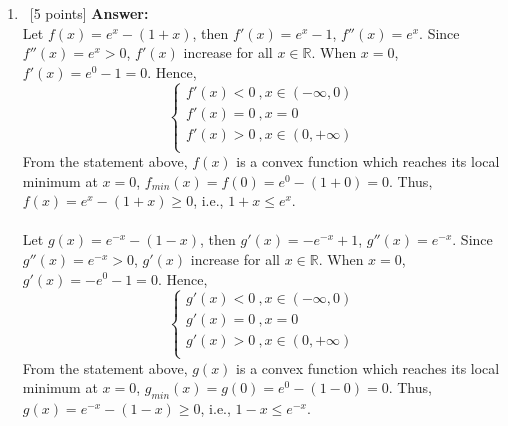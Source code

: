 \documentclass[12pt, fullpage,letterpaper]{article}
\begin{document}
\begin{enumerate}
\item~[5 points]
\textbf{Answer:}\\
Let $f(x)=e^x-(1+x)$, then $f'(x)=e^x-1$, $f''(x)=e^x$. Since $f''(x)=e^x > 0$, $f'(x)$ increase for all $x \in \mathbb{R}$. When $x=0$, $f'(x)=e^0-1=0$. Hence,
\[
\begin{cases}
f'(x)<0 \ ,x \in (-\infty, 0)\\
f'(x)=0 \ ,x = 0\\
f'(x)>0 \ ,x \in (0, +\infty)\\
\end{cases}
\]
From the statement above, $f(x)$ is a convex function which reaches its local minimum at $x=0$, $f_{min}(x)=f(0)=e^0-(1+0)=0$. Thus, $f(x)=e^x-(1+x) \ge 0$, i.e., $1+x \le e^x$.\\\\
Let $g(x)=e^{-x}-(1-x)$, then $g'(x)=-e^{-x}+1$, $g''(x)=e^{-x}$. Since $g''(x)=e^{-x} > 0$, $g'(x)$ increase for all $x \in \mathbb{R}$. When $x=0$, $g'(x)=-e^0-1=0$. Hence,
\[
\begin{cases}
g'(x)<0 \ ,x \in (-\infty, 0)\\
g'(x)=0 \ ,x = 0\\
g'(x)>0 \ ,x \in (0, +\infty)\\
\end{cases}
\]
From the statement above, $g(x)$ is a convex function which reaches its local minimum at $x=0$, $g_{min}(x)=g(0)=e^0-(1-0)=0$. Thus, $g(x)=e^{-x}-(1-x) \ge 0$, i.e., $1-x \le e^{-x}$.
\end{enumerate}
\end{document}
